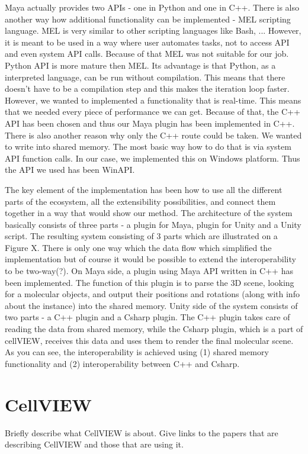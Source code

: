 \documentclass[
  digital, %
  table,   %
  lof,     %
  lot,     %
]{fithesis3}
\begin{document}
Maya actually provides two APIs - one in Python and one in C++. There is also another way how additional functionality can be implemented - MEL scripting language. MEL is very similar to other scripting languages like Bash, ... However, it is meant to be used in a way where user automates tasks, not to access API and even system API calls. Because of that MEL was not suitable for our job. Python API is more mature then MEL. Its advantage is that Python, as a interpreted language, can be run without compilation. This means that there doesn't have to be a compilation step and this makes the iteration loop faster. However, we wanted to implemented a functionality that is real-time. This means that we needed every piece of performance we can get. Because of that, the C++ API has been chosen and thus our Maya plugin has been implemented in C++.
There is also another reason why only the C++ route could be taken. We wanted to write into shared memory. The most basic way how to do that is via system API function calls. In our case, we implemented this on Windows platform. Thus the API we used has been WinAPI.


The key element of the implementation has been how to use all the different parts of the ecosystem, all the extensibility possibilities, and connect them together in a way that would show our method. The architecture of the system basically consists of three parts - a plugin for Maya, plugin for Unity and a Unity script.
The resulting system consisting of 3 parts which are illustrated on a Figure X. There is only one way which the data flow which simplified the implementation but of course it would be possible to extend the interoperability to be two-way(?).
On Maya side, a plugin using Maya API written in C++ has been implemented. The function of this plugin is to parse the 3D scene, looking for a molecular objects, and output their positions and rotations (along with info about the instance) into the shared memory.
Unity side of the system consists of two parts - a C++ plugin and a Csharp plugin. The C++ plugin takes care of reading the data from shared memory, while the Csharp plugin, which is a part of cellVIEW, receives this data and uses them to render the final molecular scene. As you can see, the interoperability is achieved using (1) shared memory functionality and (2) interoperability between C++ and Csharp.

\section{CellVIEW}
Briefly describe what CellVIEW is about. Give links to the papers that are describing CellVIEW and those that are using it.
\end{document}
